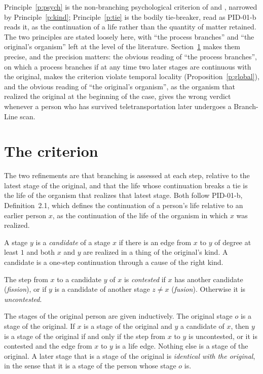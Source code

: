 \documentclass{situationist-preprint}
\begin{document}
Principle~\ref{p:psych} is the non-branching psychological criterion of \citet{Shoemaker1984} and \citet{Parfit1984}, narrowed by Principle~\ref{p:kind}; Principle~\ref{p:tie} is the bodily tie-breaker, read as PID-01-b reads it, as the continuation of a life rather than the quantity of matter retained. The two principles are stated loosely here, with \enquote{the process branches} and \enquote{the original's organism} left at the level of the literature. Section~\ref{s:criterion} makes them precise, and the precision matters: the obvious reading of \enquote{the process branches}, on which a process branches if at any time two later stages are continuous with the original, makes the criterion violate temporal locality (Proposition~\ref{p:global}), and the obvious reading of \enquote{the original's organism}, as the organism that realized the original at the beginning of the case, gives the wrong verdict whenever a person who has survived teletransportation later undergoes a Branch-Line scan.

\section{The criterion}\label{s:criterion}

The two refinements are that branching is assessed at each step, relative to the latest stage of the original, and that the life whose continuation breaks a tie is the life of the organism that realizes that latest stage. Both follow PID-01-b, Definition~2.1, which defines the continuation of a person's life relative to an earlier person $x$, as the continuation of the life of the organism in which $x$ was realized.

\begin{definition}[Candidate]\label{d:cand}
A stage $y$ is a \emph{candidate} of a stage $x$ if there is an edge from $x$ to $y$ of degree at least $1$ and both $x$ and $y$ are realized in a thing of the original's kind. A candidate is a one-step continuation through a cause of the right kind.
\end{definition}

\begin{definition}\label{d:contested}
The step from $x$ to a candidate $y$ of $x$ is \emph{contested} if $x$ has another candidate (\emph{fission}), or if $y$ is a candidate of another stage $z \neq x$ (\emph{fusion}). Otherwise it is \emph{uncontested}.
\end{definition}

\begin{definition}\label{d:crit}
The stages of the original person are given inductively. The original stage $o$ is a stage of the original. If $x$ is a stage of the original and $y$ a candidate of $x$, then $y$ is a stage of the original if and only if the step from $x$ to $y$ is uncontested, or it is contested and the edge from $x$ to $y$ is a life edge. Nothing else is a stage of the original. A later stage that is a stage of the original is \emph{identical with the original}, in the sense that it is a stage of the person whose stage $o$ is.
\end{definition}
\end{document}
